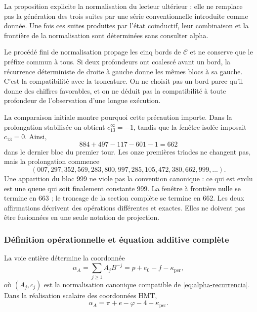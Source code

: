 La proposition explicite la normalisation du lecteur ultérieur : elle ne remplace pas la génération des trois suites par une série conventionnelle introduite comme donnée. Une fois ces suites produites par l'état coinductif, leur combinaison et la frontière de la normalisation sont déterminées sans consulter alpha.

Le procédé fini de normalisation propage les cinq
bords de \(\mathcal C\) et ne conserve que le préfixe commun à
tous. Si deux profondeurs ont coalescé avant un bord,
la récurrence déterministe de droite à gauche donne les mêmes blocs
à sa gauche. C’est la compatibilité avec la troncature. On ne
choisit pas un bord parce qu’il donne des chiffres favorables, et on ne déduit pas la
compatibilité à toute profondeur de l’observation d’une longue exécution.

La comparaison initiale montre pourquoi cette précaution importe. Dans
la prolongation stabilisée on obtient \(c_{13}^{\infty}=-1\), tandis
que la fenêtre isolée imposait \(c_{13}=0\). Ainsi,
\[
 884+497-117-601-1=662
\]
dans le dernier bloc du premier tour. Les onze premières triades ne
changent pas, mais la prolongation commence
\[
 (007,297,352,569,283,800,997,285,105,472,380,662,999,\ldots).
\]
Une apparition du bloc 999 ne viole pas la convention canonique : ce
qui est exclu est une queue qui soit finalement constante 999. La fenêtre
à frontière nulle se termine en 663 ; le troncage de la section complète
se termine en 662. Les deux affirmations décrivent des opérations différentes
et exactes. Elles ne doivent pas être fusionnées en une seule notation de projection.

\subsubsection{Définition opérationnelle et équation additive complète}
\label{subsec:alpha-definicion}

\begin{definition}
\label{def:alpha-operativa}
La voie entière détermine la coordonnée
\begin{equation}
 \alpha_A=\sum_{j\geq1}A_jB^{-j}
 =p+e_0-f-\kappa_{\mathrm{per}},
 \label{eq:alpha-via-a}
\end{equation}
où \((A_j,c_j)\) est la normalisation canonique compatible de
\eqref{eq:alpha-recurrencia}. Dans la réalisation scalaire des
coordonnées HMT,
\begin{equation}
 \boxed{\alpha_A=
 \pi+e-\varphi
 -4-\kappa_{\mathrm{per}}.}
 \label{eq:alpha-identidad-completa}
\end{equation}
\end{definition}

